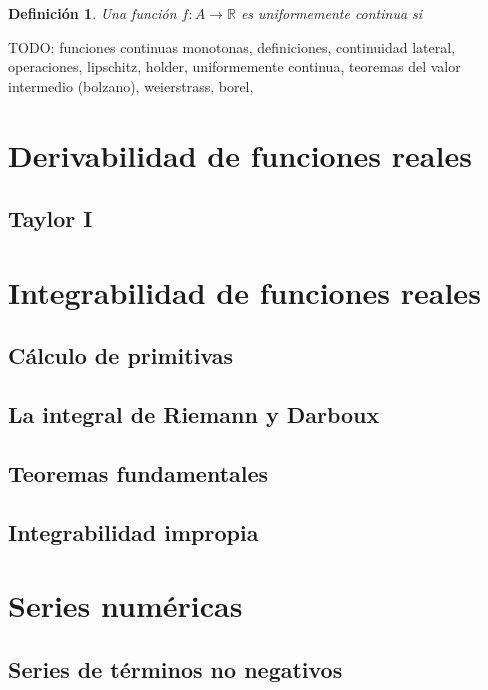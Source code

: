 \documentclass{article}
\newtheorem{define}{Definición}
\newcommand{\reales}{\mathbb{R}}
\begin{document}
\begin{define}
	Una función $f: A \rightarrow \reales$ es uniformemente continua si
\end{define}

TODO: funciones continuas monotonas, definiciones, continuidad lateral, operaciones, lipschitz, holder, uniformemente continua, teoremas del valor intermedio (bolzano), weierstrass, borel, 


\section{Derivabilidad de funciones reales}
\subsection{Taylor I}





\section{Integrabilidad de funciones reales}

\subsection{Cálculo de primitivas}

\subsection{La integral de Riemann y Darboux}

\subsection{Teoremas fundamentales}

\subsection{Integrabilidad impropia}





\section{Series numéricas}

\subsection{Series de términos no negativos}
\end{document}
